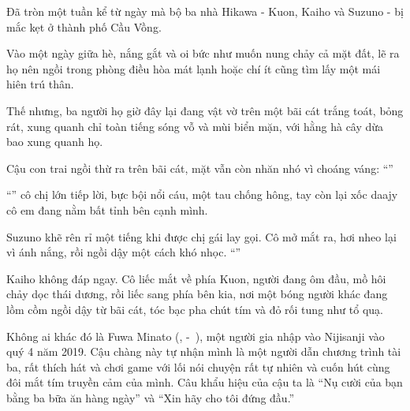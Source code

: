 \documentclass[../main.tex]{subfiles}
\begin{document}

Đã tròn một tuần kể từ ngày mà bộ ba nhà Hikawa - Kuon, Kaiho và Suzuno - bị mắc kẹt ở thành phố Cầu Vồng.

Vào một ngày giữa hè, nắng gắt và oi bức như muốn nung chảy cả mặt đất, lẽ ra họ nên ngồi trong phòng điều hòa mát lạnh hoặc chí ít cũng tìm lấy một mái hiên trú thân.

Thế nhưng, ba người họ giờ đây lại đang vật vờ trên một bãi cát trắng toát, bỏng rát, xung quanh chỉ toàn tiếng sóng vỗ và mùi biển mặn, với hằng hà cây dừa bao xung quanh họ.


Cậu con trai ngồi thừ ra trên bãi cát, mặt vẫn còn nhăn nhó vì choáng váng: ``''

``'' cô chị lớn tiếp lời, bực bội nổi cáu, một tau chống hông, tay còn lại xốc daajy cô em đang nằm bất tỉnh bên cạnh mình.

Suzuno khẽ rên rỉ một tiếng khi được chị gái lay gọi. Cô mở mắt ra, hơi nheo lại vì ánh nắng, rồi ngồi dậy một cách khó nhọc. ``''

Kaiho không đáp ngay. Cô liếc mắt về phía Kuon, người đang ôm đầu, mồ hôi chảy dọc thái dương, rồi liếc sang phía bên kia, nơi một bóng người khác đang lồm cồm ngồi dậy từ bãi cát, tóc bạc pha chút tím và đỏ rối tung như tổ quạ.

\chrint


Không ai khác đó là Fuwa Minato (, -\ ), một người gia nhập vào Nijisanji vào quý 4 năm 2019. Cậu chàng này tự nhận mình là một người dẫn chương trình tài ba, rất thích hát và chơi game với lối nói chuyện rất tự nhiên và cuốn hút cùng đôi mắt tím truyền cảm của mình. Câu khẩu hiệu của cậu ta là ``Nụ cười của bạn bằng ba bữa ăn hàng ngày'' và ``Xin hãy cho tôi đứng đầu.''
\end{document}
